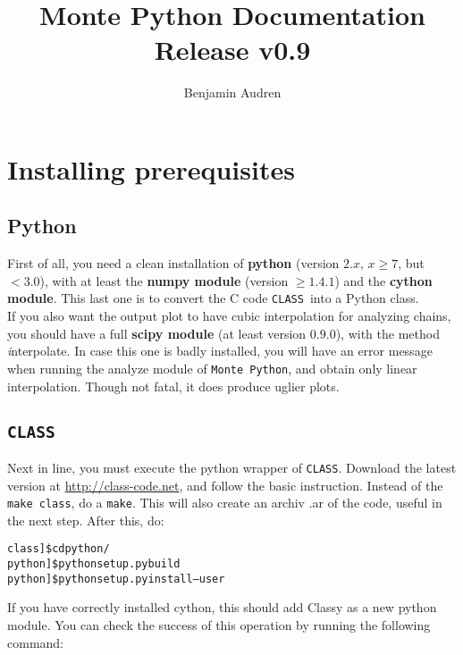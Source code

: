 \documentclass[10pt]{article}
\title{ {\huge \bf Monte Python Documentation}\\Release v0.9}
\author{Benjamin Audren}
\newcommand{\CLASS}{\texttt{CLASS}}
\newcommand{\MP}{\texttt{Monte Python}}
\begin{document}
\maketitle

\newpage

\tableofcontents

\newpage

\section{Installing prerequisites}

  \subsection{Python}

  First of all, you need a clean installation of {\bf python} (version $2.x$,
  $x\geq7$, but $<3.0$), with at least the {\bf numpy module} (version
  $\geq1.4.1$) and the {\bf cython module}. This last one is to convert the C
  code \CLASS~into a Python class.\\

  If you also want the output plot to have cubic interpolation for analyzing
  chains, you should have a full {\bf scipy module} (at least version $0.9.0$),
  with the method {\emph interpolate}. In case this one is badly installed, you
  will have an error message when running the analyze module of \MP,
  and obtain only linear interpolation. Though not fatal, it does produce
  uglier plots.

  \subsection{\CLASS}

  Next in line, you must execute the python wrapper of \CLASS. Download the
  latest version at \url{http://class-code.net}, and follow the basic
  instruction.  Instead of the \verb?make class?, do a \verb?make?. This will
  also create an archiv .ar of the code, useful in the next step. After this, do:

  \begin{alltt}
   class]\$ cd python/
   python]\$ python setup.py build
   python]\$ python setup.py install --user
  \end{alltt}

  If you have correctly installed cython, this should add Classy as a new python
  module. You can check the success of this operation by running the following
  command:
\end{document}

